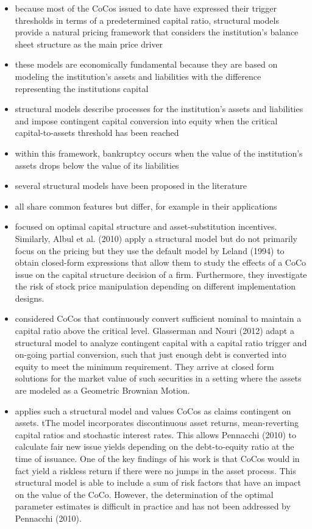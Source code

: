 \begin{itemize}
\item because most of the CoCos issued to date have expressed their trigger thresholds in terms of a predetermined capital ratio, structural models provide a natural pricing framework that considers the institution's balance sheet structure as the main price driver
\item these models are economically fundamental because they are based on modeling the institution's assets and liabilities with the difference representing the institutions capital
\item structural models describe processes for the institution's assets and liabilities and impose contingent capital conversion into equity when the critical capital-to-assets threshold has been reached
\item within this framework, bankruptcy occurs when the value of the institution's assets drops below the value of its liabilities
\item several structural models have been proposed in the literature
\item all share common features but differ, for example in their applications
\item \citet{albul2010contingent} focused on optimal capital structure and asset-substitution incentives. Similarly, Albul et al. (2010) apply a structural model but do not primarily focus on the pricing but they use the default model by Leland (1994) to obtain closed-form expressions that allow them to study the effects of a CoCo issue on the capital structure decision of a firm. Furthermore, they investigate the risk of stock price manipulation depending on different implementation designs.
\item \citet{glasserman2012contingent} considered CoCos that continuously convert sufficient nominal to maintain a capital ratio above the critical level. Glasserman and Nouri (2012) adapt a structural model to analyze contingent capital with a capital ratio trigger and on-going partial conversion, such that just enough debt is converted into equity to meet the minimum requirement. They arrive at closed form solutions for the market value of such securities in a setting where the assets are modeled as a Geometric Brownian Motion.
\item \citet{pennacchi2010structural} applies such a structural model and values CoCos as claims contingent on assets. tThe model incorporates discontinuous asset returns, mean-reverting capital ratios and stochastic interest rates. This allows Pennacchi (2010) to calculate fair new issue yields depending on the debt-to-equity ratio at the time of issuance. One of the key findings of his work is that CoCos would in fact yield a riskless return if there were no jumps in the asset process. This structural model is able to include a sum of risk factors that have an impact on the value of the CoCo. However, the determination of the optimal parameter estimates is difficult in practice and has not been addressed by Pennacchi (2010).

\end{itemize}
